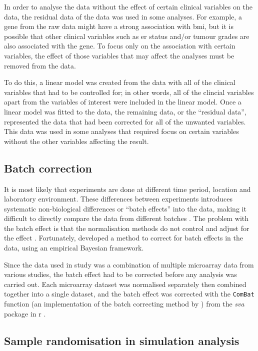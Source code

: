 In order to analyse the data without the effect of certain clinical variables on the data, the residual data of the data was used in some analyses.
For example, a gene from the raw data might have a strong association with \gls{bmi}, but it is possible that other clinical variables such as \gls{er} status and/or tumour grades are also associated with the gene.
To focus only on the association with certain variables, the effect of those variables that may affect the analyses must be removed from the data.

To do this, a linear model was created from the data with all of the clinical variables that had to be controlled for; in other words, all of the clincial variables apart from the variables of interest were included in the linear model.
Once a linear model was fitted to the data, the remaining data, or the ``residual data'', represented the data that had been corrected for all of the unwanted variables.
This data was used in some analyses that required focus on certain variables without the other variables affecting the result.

\subsection{Batch correction}
\label{sub:batch_correction}

It is most likely that experiments are done at different time period, location and laboratory environment.
These differences between experiments introduces systematic non-biological differences or ``batch effects'' into the data, making it difficult to directly compare the data from different batches \citep{Johnson2007}.
The problem with the batch effect is that the normalisation methods do not control and adjust for the effect \citep{Johnson2007}.
Fortunately, \citet{Johnson2007} developed a method to correct for batch effects in the data, using an empirical Bayesian framework.

Since the data used in \citet{Gatza2010a} study was a combination of multiple microarray data from various studies, the batch effect had to be corrected before any analysis was carried out.
Each microarray dataset was normalised separately then combined together into a single dataset, and the batch effect was corrected with the \texttt{ComBat} function (an implementation of the batch correcting method by \citet{Johnson2007}) from the \textit{sva} package in \gls{r} \citep{Leek2012}.

\subsection{Sample randomisation in simulation analysis}
\label{sub:sample_randomisation_in_simulation_analysis}

